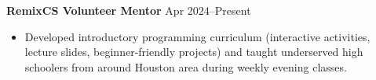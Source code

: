 \textbf{RemixCS Volunteer Mentor} \hfill Apr 2024--Present

\begin{itemize}
	\item Developed introductory programming curriculum (interactive activities, lecture slides, beginner-friendly projects) and taught underserved high schoolers from around Houston area during weekly evening classes.
\end{itemize}\par